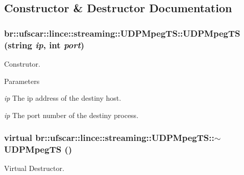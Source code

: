 \subsection{Constructor \& Destructor Documentation}
\hypertarget{classbr_1_1ufscar_1_1lince_1_1streaming_1_1UDPMpegTS_a4bb698eefa459f445938a822a2eb1a8f}{
\subsubsection[{UDPMpegTS}]{\setlength{\rightskip}{0pt plus 5cm}br::ufscar::lince::streaming::UDPMpegTS::UDPMpegTS (string {\em ip}, \/  int {\em port})}}
\label{classbr_1_1ufscar_1_1lince_1_1streaming_1_1UDPMpegTS_a4bb698eefa459f445938a822a2eb1a8f}


Construtor. 


\begin{DoxyParams}{Parameters}
\item[{\em ip}]The ip address of the destiny host. \item[{\em ip}]The port number of the destiny process. \end{DoxyParams}
\hypertarget{classbr_1_1ufscar_1_1lince_1_1streaming_1_1UDPMpegTS_a806c474fe20b34b899bd048da6997bb2}{
\subsubsection[{$\sim$UDPMpegTS}]{\setlength{\rightskip}{0pt plus 5cm}virtual br::ufscar::lince::streaming::UDPMpegTS::$\sim$UDPMpegTS ()}}
\label{classbr_1_1ufscar_1_1lince_1_1streaming_1_1UDPMpegTS_a806c474fe20b34b899bd048da6997bb2}


Virtual Destructor. 



